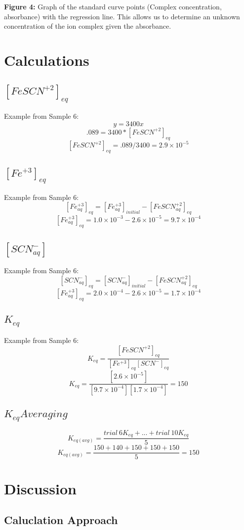 \documentclass{article}
\begin{document}
\textbf{Figure 4:} Graph of the standard curve points (Complex concentration, absorbance) with the regression line. This allows us to determine an unknown concentration of the ion complex given the absorbance.

\newpage
\section{Calculations}
\subsection{$[FeSCN^{+2}]_{eq}$}
Example from Sample 6: 
$$y=3400x$$
$$.089=3400*[FeSCN^{+2}]_{eq}$$
$$[FeSCN^{+2}]_{eq}=.089/3400 = 2.9\times10^{-5}$$
\subsection{$[Fe^{+3}]_{eq}$}
Example from Sample 6:
$$[{Fe^{+3}_{aq}}]_{eq} = [{Fe^{+3}_{aq}}]_{initial} - [{FeSCN^{+2}_{aq}}]_{eq}$$
$$[{Fe^{+3}_{aq}}]_{eq} = 1.0\times10^{-3} - 2.6\times10^{-5} = 9.7\times10^{-4}$$
\subsection{$[SCN^-_{aq}]$}
Example from Sample 6:
$$[{SCN^{-}_{aq}}]_{eq} = [{SCN^-_{aq}}]_{initial} - [{FeSCN^{+2}_{aq}}]_{eq}$$
$$[{Fe^{+3}_{aq}}]_{eq} = 2.0\times10^{-4} - 2.6\times10^{-5} = 1.7\times10^{-4}$$
\subsection{$K_{eq}$}
Example from Sample 6:
$$K_{eq} = \frac{[FeSCN^{+2}]_{eq}}{[Fe^{+3}]_{eq}[SCN^-]_{eq}}$$
$$K_{eq} = \frac{[2.6\times10^{-5}]}{[9.7\times10^{-4}][1.7\times 10^{-4}]} = 150$$
\subsection{$K_{eq} Averaging$}
$$K_{eq(avg)} = \frac{trial\ 6 K_{eq}+...+trial\ 10 K_{eq}}{5}$$
$$K_{eq(avg)} = \frac{150+140+150+150+150}{5} = 150$$

\newpage
\section{Discussion}
\subsection{Caluclation Approach}
\end{document}
